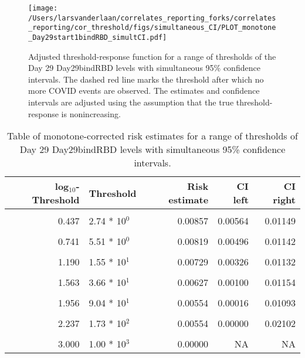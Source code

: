 \documentclass[]{article}
\begin{document}
\begin{figure}[H]
\centering
\texttt{[image: /Users/larsvanderlaan/correlates\_reporting\_forks/correlates\_reporting/cor\_threshold/figs/simultaneous\_CI/PLOT\_monotone\_Day29start1bindRBD\_simultCI.pdf]}
\caption{Adjusted threshold-response function for a range of thresholds of the
  Day 29 Day29bindRBD levels with simultaneous 95\% confidence intervals. The dashed red line marks the threshold after which no more COVID events are observed. The estimates and confidence intervals are adjusted using the assumption that the true threshold-response is nonincreasing.}
\end{figure}
\begin{table}[!h]

\caption{\label{tab:unnamed-chunk-74}Table of monotone-corrected risk estimates for a range of thresholds of Day 29 Day29bindRBD levels with simultaneous 95\% confidence intervals.}
\centering
\begin{tabular}[t]{rlrrr}
\toprule
log$_{10}$-Threshold & Threshold & Risk estimate & CI left & CI right\\
\midrule
\cellcolor{gray!6}{-0.099} & \cellcolor{gray!6}{7.96 * 10$^{1}$} & \cellcolor{gray!6}{0.00876} & \cellcolor{gray!6}{0.00598} & \cellcolor{gray!6}{0.01154}\\
0.437 & 2.74 * 10$^{0}$ & 0.00857 & 0.00564 & 0.01149\\
\cellcolor{gray!6}{0.585} & \cellcolor{gray!6}{3.85 * 10$^{0}$} & \cellcolor{gray!6}{0.00857} & \cellcolor{gray!6}{0.00544} & \cellcolor{gray!6}{0.01169}\\
0.741 & 5.51 * 10$^{0}$ & 0.00819 & 0.00496 & 0.01142\\
\cellcolor{gray!6}{1.000} & \cellcolor{gray!6}{1.00 * 10$^{1}$} & \cellcolor{gray!6}{0.00788} & \cellcolor{gray!6}{0.00450} & \cellcolor{gray!6}{0.01126}\\
1.190 & 1.55 * 10$^{1}$ & 0.00729 & 0.00326 & 0.01132\\
\cellcolor{gray!6}{1.371} & \cellcolor{gray!6}{2.35 * 10$^{1}$} & \cellcolor{gray!6}{0.00671} & \cellcolor{gray!6}{0.00219} & \cellcolor{gray!6}{0.01122}\\
1.563 & 3.66 * 10$^{1}$ & 0.00627 & 0.00100 & 0.01154\\
\cellcolor{gray!6}{1.852} & \cellcolor{gray!6}{7.11 * 10$^{1}$} & \cellcolor{gray!6}{0.00621} & \cellcolor{gray!6}{0.00012} & \cellcolor{gray!6}{0.01229}\\
1.956 & 9.04 * 10$^{1}$ & 0.00554 & 0.00016 & 0.01093\\
\cellcolor{gray!6}{2.083} & \cellcolor{gray!6}{1.21 * 10$^{2}$} & \cellcolor{gray!6}{0.00554} & \cellcolor{gray!6}{0.00000} & \cellcolor{gray!6}{0.02102}\\
2.237 & 1.73 * 10$^{2}$ & 0.00554 & 0.00000 & 0.02102\\
\cellcolor{gray!6}{2.699} & \cellcolor{gray!6}{5.00 * 10$^{2}$} & \cellcolor{gray!6}{0.00000} & \cellcolor{gray!6}{NA} & \cellcolor{gray!6}{NA}\\
3.000 & 1.00 * 10$^{3}$ & 0.00000 & NA & NA\\
\bottomrule
\end{tabular}
\end{table}
\end{document}
